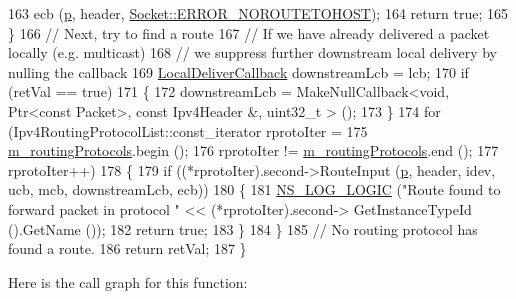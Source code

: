 \begin{DoxyCode}
163       ecb (\hyperlink{lte__link__budget_8m_ac9de518908a968428863f829398a4e62}{p}, header, \hyperlink{classns3_1_1Socket_ada1328c5ae0c28cb2a982caf8f6d6ccaa0f8ecb5a4ddbce3bade35fa12c3d49e8}{Socket::ERROR\_NOROUTETOHOST});
164       \textcolor{keywordflow}{return} \textcolor{keyword}{true};
165     \}
166   \textcolor{comment}{// Next, try to find a route}
167   \textcolor{comment}{// If we have already delivered a packet locally (e.g. multicast)}
168   \textcolor{comment}{// we suppress further downstream local delivery by nulling the callback}
169   \hyperlink{classns3_1_1Ipv4RoutingProtocol_aa6ffa0159cb143daa3c46d2ba69bb1b9}{LocalDeliverCallback} downstreamLcb = lcb;
170   \textcolor{keywordflow}{if} (retVal == \textcolor{keyword}{true})
171     \{
172       downstreamLcb = MakeNullCallback<void, Ptr<const Packet>, \textcolor{keyword}{const} Ipv4Header &, uint32\_t > ();
173     \}
174   \textcolor{keywordflow}{for} (Ipv4RoutingProtocolList::const\_iterator rprotoIter =
175          \hyperlink{classns3_1_1Ipv4ListRouting_a49de17cac4bf72e28b064bff3a93d29d}{m\_routingProtocols}.begin ();
176        rprotoIter != \hyperlink{classns3_1_1Ipv4ListRouting_a49de17cac4bf72e28b064bff3a93d29d}{m\_routingProtocols}.end ();
177        rprotoIter++)
178     \{
179       \textcolor{keywordflow}{if} ((*rprotoIter).second->RouteInput (\hyperlink{lte__link__budget_8m_ac9de518908a968428863f829398a4e62}{p}, header, idev, ucb, mcb, downstreamLcb, ecb))
180         \{
181           \hyperlink{group__logging_ga88acd260151caf2db9c0fc84997f45ce}{NS\_LOG\_LOGIC} (\textcolor{stringliteral}{"Route found to forward packet in protocol "} << (*rprotoIter).second->
      GetInstanceTypeId ().GetName ()); 
182           \textcolor{keywordflow}{return} \textcolor{keyword}{true};
183         \}
184     \}
185   \textcolor{comment}{// No routing protocol has found a route.}
186   \textcolor{keywordflow}{return} retVal;
187 \}
\end{DoxyCode}


Here is the call graph for this function\+:



